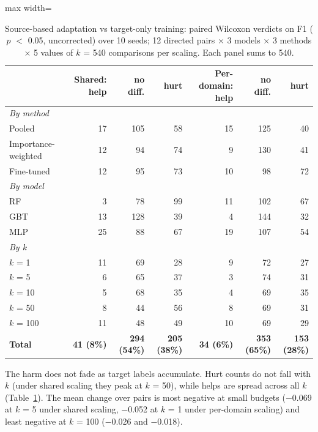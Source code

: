 \documentclass[11pt]{article}
\begin{document}
\begin{table}[t]
\centering
\small
\caption{Source-based adaptation vs target-only training: paired Wilcoxon verdicts on F1 ($p$ $<$ 0.05, uncorrected) over 10 seeds; 12 directed pairs $\times$ 3 models $\times$ 3 methods $\times$ 5 values of $k$ = 540 comparisons per scaling. Each panel sums to 540.}
\label{tab:2}
\begin{adjustbox}{max width=\linewidth}
\begin{tabular}{lrrrrrr}
\toprule
 & Shared: help & no diff. & hurt & Per-domain: help & no diff. & hurt \\
\midrule
\multicolumn{7}{l}{\emph{By method}} \\
Pooled & 17 & 105 & 58 & 15 & 125 & 40 \\
Importance-weighted & 12 & 94 & 74 & 9 & 130 & 41 \\
Fine-tuned & 12 & 95 & 73 & 10 & 98 & 72 \\
\midrule
\multicolumn{7}{l}{\emph{By model}} \\
RF & 3 & 78 & 99 & 11 & 102 & 67 \\
GBT & 13 & 128 & 39 & 4 & 144 & 32 \\
MLP & 25 & 88 & 67 & 19 & 107 & 54 \\
\midrule
\multicolumn{7}{l}{\emph{By k}} \\
$k$ = 1 & 11 & 69 & 28 & 9 & 72 & 27 \\
$k$ = 5 & 6 & 65 & 37 & 3 & 74 & 31 \\
$k$ = 10 & 5 & 68 & 35 & 4 & 69 & 35 \\
$k$ = 50 & 8 & 44 & 56 & 8 & 69 & 31 \\
$k$ = 100 & 11 & 48 & 49 & 10 & 69 & 29 \\
\midrule
\textbf{Total} & \textbf{41 (8\%)} & \textbf{294 (54\%)} & \textbf{205 (38\%)} & \textbf{34 (6\%)} & \textbf{353 (65\%)} & \textbf{153 (28\%)} \\
\bottomrule
\end{tabular}
\end{adjustbox}
\end{table}

The harm does not fade as target labels accumulate. Hurt counts do not fall with $k$ (under shared scaling they peak at $k$ = 50), while helps are spread across all $k$ (Table~\ref{tab:2}). The mean change over pairs is most negative at small budgets ($-$0.069 at $k$ = 5 under shared scaling, $-$0.052 at $k$ = 1 under per-domain scaling) and least negative at $k$ = 100 ($-$0.026 and $-$0.018).
\end{document}

